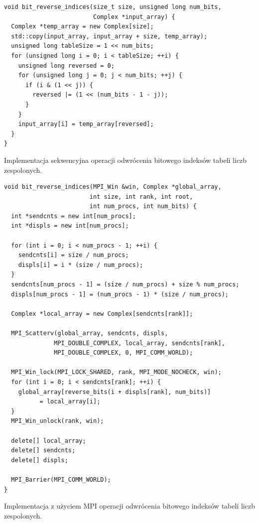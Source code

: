\documentclass[a4paper,12pt]{book} %
\begin{document}
\begin{lstfloat}
\lstset{language=C++}
\begin{lstlisting}[frame=single]
void bit_reverse_indices(size_t size, unsigned long num_bits,
                         Complex *input_array) {
  Complex *temp_array = new Complex[size];
  std::copy(input_array, input_array + size, temp_array);
  unsigned long tableSize = 1 << num_bits;
  for (unsigned long i = 0; i < tableSize; ++i) {
    unsigned long reversed = 0;
    for (unsigned long j = 0; j < num_bits; ++j) {
      if (i & (1 << j)) {
        reversed |= (1 << (num_bits - 1 - j));
      }
    }
    input_array[i] = temp_array[reversed];
  }
}
\end{lstlisting}
\caption{Implementacja sekwencyjna operacji odwrócenia bitowego indeksów tabeli liczb zespolonych.}
\label{lst:bit-reverse-seq}
\end{lstfloat}

\begin{lstfloat}
\lstset{language=C++}
\begin{lstlisting}[frame=single]
void bit_reverse_indices(MPI_Win &win, Complex *global_array,
 						int size, int rank, int root,
 						int num_procs, int num_bits) {
  int *sendcnts = new int[num_procs];
  int *displs = new int[num_procs];

  for (int i = 0; i < num_procs - 1; ++i) {
    sendcnts[i] = size / num_procs;
    displs[i] = i * (size / num_procs);
  }
  sendcnts[num_procs - 1] = (size / num_procs) + size % num_procs;
  displs[num_procs - 1] = (num_procs - 1) * (size / num_procs);

  Complex *local_array = new Complex[sendcnts[rank]];

  MPI_Scatterv(global_array, sendcnts, displs,
  			  MPI_DOUBLE_COMPLEX, local_array, sendcnts[rank],
  			  MPI_DOUBLE_COMPLEX, 0, MPI_COMM_WORLD);

  MPI_Win_lock(MPI_LOCK_SHARED, rank, MPI_MODE_NOCHECK, win);
  for (int i = 0; i < sendcnts[rank]; ++i) {
    global_array[reverse_bits(i + displs[rank], num_bits)] 
    	  = local_array[i];
  }
  MPI_Win_unlock(rank, win);

  delete[] local_array;
  delete[] sendcnts;
  delete[] displs;

  MPI_Barrier(MPI_COMM_WORLD);
}
\end{lstlisting}
\caption{Implementacja z użyciem MPI operacji odwrócenia bitowego indeksów tabeli liczb zespolonych.}
\label{lst:bit-reverse-mpi}
\end{lstfloat}
\end{document}
